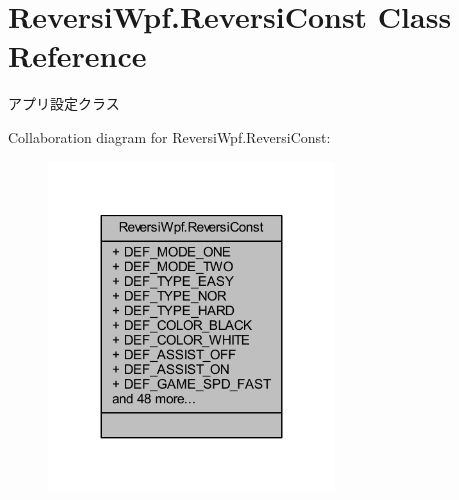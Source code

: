 \hypertarget{class_reversi_wpf_1_1_reversi_const}{}\section{Reversi\+Wpf.\+Reversi\+Const Class Reference}
\label{class_reversi_wpf_1_1_reversi_const}


アプリ設定クラス  




Collaboration diagram for Reversi\+Wpf.\+Reversi\+Const\+:\nopagebreak
\begin{figure}[H]
\begin{center}
\leavevmode
\includegraphics[width=215pt]{class_reversi_wpf_1_1_reversi_const__coll__graph}
\end{center}
\end{figure}
